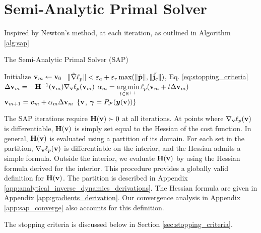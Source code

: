 
\section{Semi-Analytic Primal Solver}
\label{sec:sap_solver}

Inspired by Newton's method,  at each iteration, as
outlined in Algorithm \ref{alg:sap}
\begin{algorithm}[H]
	\caption{The Semi-Analytic Primal Solver (SAP)}	
	  \label{alg:sap}
	  \begin{algorithmic}[1]
		  \State Initialize ${\mathbf{v}}_m \gets {\mathbf{v}}_0$ \RepeatUntil
		  $~\Vert\tilde{\nabla}\ell_p\Vert < \varepsilon_a +
		  \varepsilon_r\max(\Vert\tilde{{\mathbf{p}}}\Vert,\Vert\tilde{{\mathbf{j}}_c}\Vert)$,
		  Eq. \eqref{eq:stopping_criteria} \State $\Delta{\mathbf{v}}_{m} =
		  -{\mathbf{H}}^{-1}({\mathbf{v}}_m)\nabla_{\mathbf{v}}\ell_p({\mathbf{v}}_m)$
		  \label{op:Newton_iteration} \State $\displaystyle \alpha_m =
		  \operatorname*{arg\,min}_{t\in\mathbb{R}^{++}} \ell_p({\mathbf{v}}_m + t \Delta{\mathbf{v}}_{m})$
		  \State $\displaystyle {\mathbf{v}}_{m+1} = {\bm{v}}_m +
		  \alpha_{m}\Delta{\mathbf{v}}_{m}$ \EndRepeatUntil \State\Return $\{{\mathbf{v}}$,
		  ${\bm\gamma}=P_\mathcal{F}({\bm{y}}({\mathbf{v}}))\}$
	  \end{algorithmic}
\end{algorithm}

The SAP iterations require ${\mathbf{H}}({\mathbf{v}})\succ 0$ at all iterations.  At points
where $\nabla_{\mathbf{v}}\ell_p({\mathbf{v}})$ is differentiable, ${\mathbf{H}}({\mathbf{v}})$ is simply
set equal to the Hessian of the cost function. In general, ${\mathbf{H}}({\mathbf{v}})$ is
evaluated using a partition of its domain. For each set in the partition,
$\nabla_{\mathbf{v}}\ell_p({\mathbf{v}})$ is differentiable on the interior, and the Hessian
admits a simple formula. Outside the interior, we evaluate ${\mathbf{H}}({\mathbf{v}})$ by
using the Hessian formula derived for the interior. This procedure provides a
globally valid definition for ${\mathbf{H}}({\mathbf{v}})$. The partition is described in
Appendix \ref{app:analytical_inverse_dynamics_derivations}. The Hessian formula
are given in Appendix \ref{app:gradients_derivation}. Our convergence analysis
in Appendix \ref{app:sap_converge} also accounts for this definition.

 The stopping criteria is discussed below in Section
\ref{sec:stopping_criteria}.

